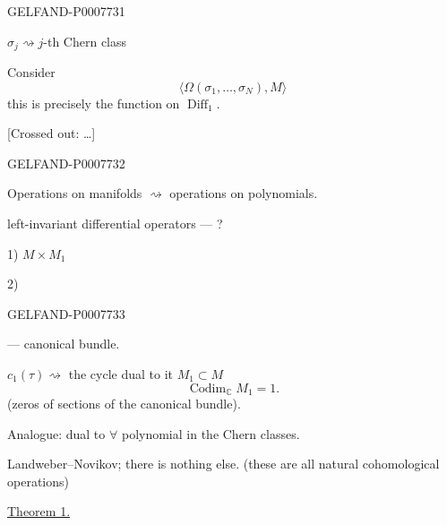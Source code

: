 \begin{GelfandAdjacentEvidence}{GELFAND-P000773}{1}

\(\sigma_j\rightsquigarrow j\)-th Chern class

Consider
\[
\langle\Omega(\sigma_1,\ldots,\sigma_N),M\rangle
\]
this is precisely the function on \(\operatorname{Diff}_1\).

[Crossed out: …]
\end{GelfandAdjacentEvidence}
\begin{GelfandAdjacentEvidence}{GELFAND-P000773}{2}

Operations on manifolds \(\rightsquigarrow\) operations on polynomials.

left-invariant differential operators --- ?

1) \(M\times M_1\)

2)
\end{GelfandAdjacentEvidence}
\begin{GelfandAdjacentEvidence}{GELFAND-P000773}{3}

--- canonical bundle.

\(c_1(\tau)\rightsquigarrow\) the cycle dual to it \(M_1\subset M\)
\[
\operatorname{Codim}_{\mathbb C}M_1=1.
\]
(zeros of sections of the canonical bundle).

Analogue: dual to \(\forall\) polynomial in the Chern classes.

Landweber--Novikov; there is nothing else. (these are all natural cohomological operations)

\underline{Theorem 1.}

\end{GelfandAdjacentEvidence}
